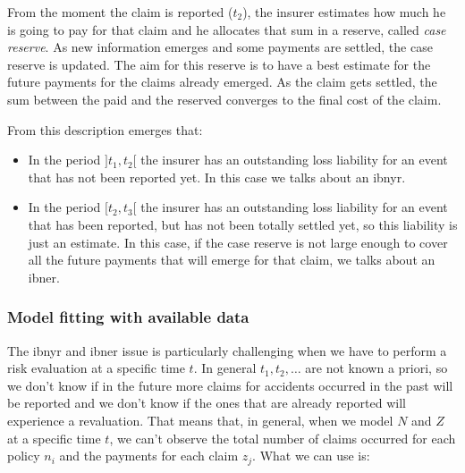 \documentclass[a4paper, twoside, openright, 12pt]{report}
\providecommand{\tightlist}{%
  \setlength{\itemsep}{0pt}\setlength{\parskip}{0pt}}
\theoremstyle{definition}
\theoremstyle{definition}
\theoremstyle{definition}
\theoremstyle{remark}
\begin{document}
From the moment the claim is reported (\(t_2\)), the insurer estimates how much he is going to pay for that claim and he allocates that sum in a reserve, called \emph{case reserve}. As new information emerges and some payments are settled, the case reserve is updated. The aim for this reserve is to have a best estimate for the future payments for the claims already emerged. As the claim gets settled, the sum between the paid and the reserved converges to the final cost of the claim.

From this description emerges that:

\begin{itemize}
\tightlist
\item
  In the period \(]t_1, t_2[\) the insurer has an outstanding loss liability for an event that has not been reported yet. In this case we talks about an \ac{ibnyr}.
\item
  In the period \([t_2, t_3[\) the insurer has an outstanding loss liability for an event that has been reported, but has not been totally settled yet, so this liability is just an estimate. In this case, if the case reserve is not large enough to cover all the future payments that will emerge for that claim, we talks about an \ac{ibner}.
\end{itemize}

\hypertarget{model-fitting-with-available-data}{%
\subsubsection{Model fitting with available data}\label{model-fitting-with-available-data}}

The \ac{ibnyr} and \ac{ibner} issue is particularly challenging when we have to perform a risk evaluation at a specific time \(t\). In general \(t_1, t_2,\dots\) are not known a priori, so we don't know if in the future more claims for accidents occurred in the past will be reported and we don't know if the ones that are already reported will experience a revaluation. That means that, in general, when we model \(N\) and \(Z\) at a specific time \(t\), we can't observe the total number of claims occurred for each policy \(n_i\) and the payments for each claim \(z_j\). What we can use is:
\end{document}
